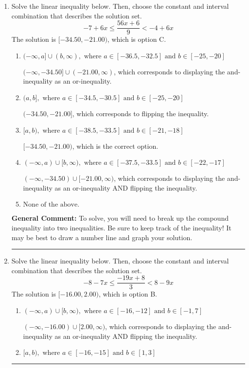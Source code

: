 \documentclass{extbook}[14pt]
\newcommand{\litem}[1]{\item #1

\rule{\textwidth}{0.4pt}}
\begin{document}
\begin{enumerate}
{\textbf{General Comment:} Remember that less/greater than or equal to includes the endpoint, while less/greater do not. Also, remember that you need to flip the inequality when you multiply or divide by a negative.
}
\litem{
Solve the linear inequality below. Then, choose the constant and interval combination that describes the solution set.
\[ -7 + 6 x \leq \frac{56 x + 6}{9} < -4 + 6 x \]
The solution is \( [-34.50, -21.00) \), which is option C.\begin{enumerate}[label=\Alph*.]
\item \( (-\infty, a] \cup (b, \infty), \text{ where } a \in [-36.5, -32.5] \text{ and } b \in [-25, -20] \)

$(-\infty, -34.50] \cup (-21.00, \infty)$, which corresponds to displaying the and-inequality as an or-inequality.
\item \( (a, b], \text{ where } a \in [-34.5, -30.5] \text{ and } b \in [-25, -20] \)

$(-34.50, -21.00]$, which corresponds to flipping the inequality.
\item \( [a, b), \text{ where } a \in [-38.5, -33.5] \text{ and } b \in [-21, -18] \)

$[-34.50, -21.00)$, which is the correct option.
\item \( (-\infty, a) \cup [b, \infty), \text{ where } a \in [-37.5, -33.5] \text{ and } b \in [-22, -17] \)

$(-\infty, -34.50) \cup [-21.00, \infty)$, which corresponds to displaying the and-inequality as an or-inequality AND flipping the inequality.
\item \( \text{None of the above.} \)


\end{enumerate}

\textbf{General Comment:} To solve, you will need to break up the compound inequality into two inequalities. Be sure to keep track of the inequality! It may be best to draw a number line and graph your solution.
}
\litem{
Solve the linear inequality below. Then, choose the constant and interval combination that describes the solution set.
\[ -8 - 7 x \leq \frac{-19 x + 8}{3} < 8 - 9 x \]
The solution is \( [-16.00, 2.00) \), which is option B.\begin{enumerate}[label=\Alph*.]
\item \( (-\infty, a) \cup [b, \infty), \text{ where } a \in [-16, -12] \text{ and } b \in [-1, 7] \)

$(-\infty, -16.00) \cup [2.00, \infty)$, which corresponds to displaying the and-inequality as an or-inequality AND flipping the inequality.
\item \( [a, b), \text{ where } a \in [-16, -15] \text{ and } b \in [1, 3] \)


\end{enumerate}}
\end{enumerate}
\end{document}
